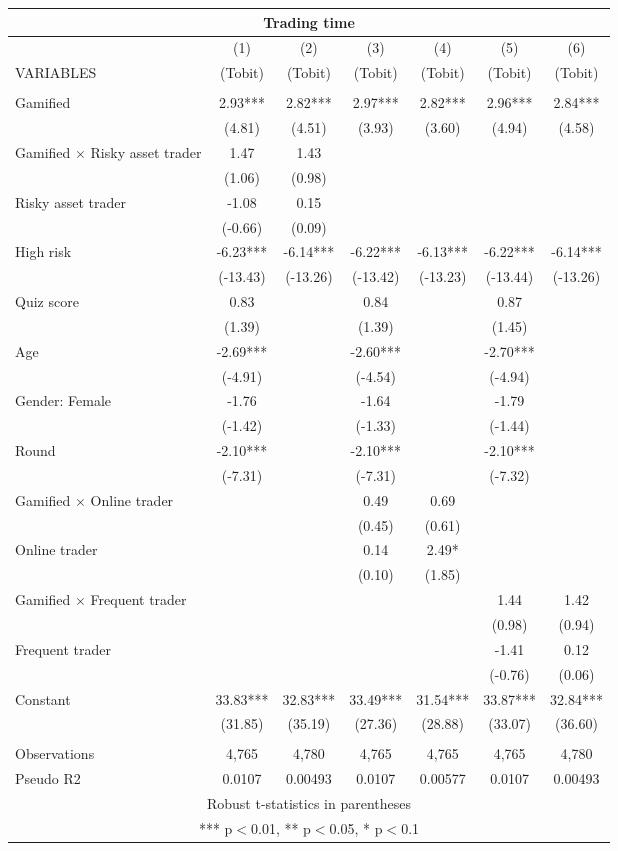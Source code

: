 \documentclass[]{article}
\begin{document}
\begin{tabular}{lcccccc}
\multicolumn{7}{c}{Trading time} \\ \hline
 & (1) & (2) & (3) & (4) & (5) & (6) \\
VARIABLES & (Tobit) & (Tobit) & (Tobit) & (Tobit) & (Tobit) & (Tobit) \\ \hline
 &  &  &  &  &  &  \\
Gamified & 2.93*** & 2.82*** & 2.97*** & 2.82*** & 2.96*** & 2.84*** \\
 & (4.81) & (4.51) & (3.93) & (3.60) & (4.94) & (4.58) \\
Gamified $\times$ Risky asset trader & 1.47 & 1.43 &  &  &  &  \\
 & (1.06) & (0.98) &  &  &  &  \\
Risky asset trader & -1.08 & 0.15 &  &  &  &  \\
 & (-0.66) & (0.09) &  &  &  &  \\
High risk & -6.23*** & -6.14*** & -6.22*** & -6.13*** & -6.22*** & -6.14*** \\
 & (-13.43) & (-13.26) & (-13.42) & (-13.23) & (-13.44) & (-13.26) \\
Quiz score & 0.83 &  & 0.84 &  & 0.87 &  \\
 & (1.39) &  & (1.39) &  & (1.45) &  \\
Age & -2.69*** &  & -2.60*** &  & -2.70*** &  \\
 & (-4.91) &  & (-4.54) &  & (-4.94) &  \\
Gender: Female & -1.76 &  & -1.64 &  & -1.79 &  \\
 & (-1.42) &  & (-1.33) &  & (-1.44) &  \\
Round & -2.10*** &  & -2.10*** &  & -2.10*** &  \\
 & (-7.31) &  & (-7.31) &  & (-7.32) &  \\
Gamified $\times$ Online trader &  &  & 0.49 & 0.69 &  &  \\
 &  &  & (0.45) & (0.61) &  &  \\
Online trader &  &  & 0.14 & 2.49* &  &  \\
 &  &  & (0.10) & (1.85) &  &  \\
Gamified $\times$ Frequent trader &  &  &  &  & 1.44 & 1.42 \\
 &  &  &  &  & (0.98) & (0.94) \\
Frequent trader &  &  &  &  & -1.41 & 0.12 \\
 &  &  &  &  & (-0.76) & (0.06) \\
Constant & 33.83*** & 32.83*** & 33.49*** & 31.54*** & 33.87*** & 32.84*** \\
 & (31.85) & (35.19) & (27.36) & (28.88) & (33.07) & (36.60) \\
 &  &  &  &  &  &  \\
Observations & 4,765 & 4,780 & 4,765 & 4,765 & 4,765 & 4,780 \\
 Pseudo R2 & 0.0107 & 0.00493 & 0.0107 & 0.00577 & 0.0107 & 0.00493 \\ \hline
\multicolumn{7}{c}{ Robust t-statistics in parentheses} \\
\multicolumn{7}{c}{ *** p$<$0.01, ** p$<$0.05, * p$<$0.1} \\
\end{tabular}
\end{document}
